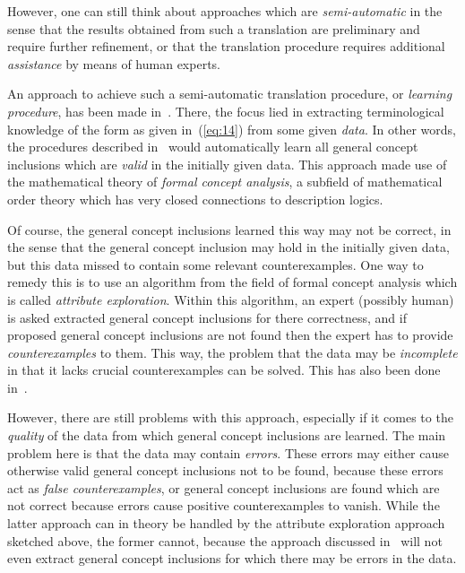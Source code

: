 However, one can still think about approaches which are \emph{semi-automatic} in the sense
that the results obtained from such a translation are preliminary and require further
refinement, or that the translation procedure requires additional \emph{assistance} by
means of human experts.

An approach to achieve such a semi-automatic translation procedure, or \emph{learning
  procedure}, has been made in~\cite{Diss-Felix}.  There, the focus lied in extracting
terminological knowledge of the form as given in~(\ref{eq:14}) from some given
\emph{data}.  In other words, the procedures described in~\cite{Diss-Felix} would
automatically learn all general concept inclusions which are \emph{valid} in the initially
given data.  This approach made use of the mathematical theory of \emph{formal concept
  analysis}, a subfield of mathematical order theory which has very closed connections to
description logics.

Of course, the general concept inclusions learned this way may not be correct, in the
sense that the general concept inclusion may hold in the initially given data, but this
data missed to contain some relevant counterexamples.  One way to remedy this is to use an
algorithm from the field of formal concept analysis which is called \emph{attribute
  exploration}.  Within this algorithm, an expert (possibly human) is asked extracted
general concept inclusions for there correctness, and if proposed general concept
inclusions are not found then the expert has to provide \emph{counterexamples} to them.
This way, the problem that the data may be \emph{incomplete} in that it lacks crucial
counterexamples can be solved.  This has also been done in~\cite{Diss-Felix}.

However, there are still problems with this approach, especially if it comes to the
\emph{quality} of the data from which general concept inclusions are learned.  The main
problem here is that the data may contain \emph{errors}.  These errors may either cause
otherwise valid general concept inclusions not to be found, because these errors act as
\emph{false counterexamples}, or general concept inclusions are found which are not
correct because errors cause positive counterexamples to vanish.  While the latter
approach can in theory be handled by the attribute exploration approach sketched above,
the former cannot, because the approach discussed in~\cite{Diss-Felix} will not even
extract general concept inclusions for which there may be errors in the data.

